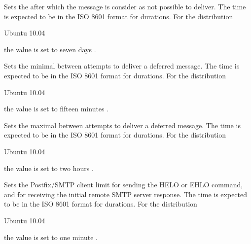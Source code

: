 
Sets the  after which the message is consider as not possible to deliver. 
The time is expected to be in the ISO 8601 format for durations.
For the distribution
\begin{inparaitem}
\item[\TheDistribution{ubuntu}] Ubuntu 10.04
\end{inparaitem}
the value is set to seven days .


Sets the minimal  between attempts to deliver a deferred message.
The time is expected to be in the ISO 8601 format for durations.
For the distribution
\begin{inparaitem}
\item[\TheDistribution{ubuntu}] Ubuntu 10.04
\end{inparaitem}
the value is set to fifteen minutes .


Sets the maximal  between attempts to deliver a deferred message.
The time is expected to be in the ISO 8601 format for durations.
For the distribution
\begin{inparaitem}
\item[\TheDistribution{ubuntu}] Ubuntu 10.04
\end{inparaitem}
the value is set to two hours .


Sets the Postfix/SMTP client  limit for sending the HELO or
EHLO command, and for receiving the initial remote SMTP server response.
The time is expected to be in the ISO 8601 format for durations.
For the distribution
\begin{inparaitem}
\item[\TheDistribution{ubuntu}] Ubuntu 10.04
\end{inparaitem}
the value is set to one minute .

